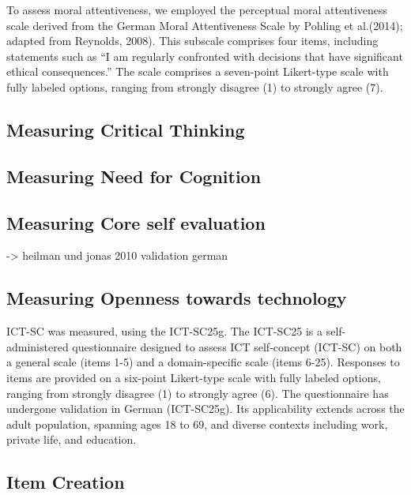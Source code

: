 \documentclass[
  12pt,
  a4paper,
  twoside]{article}
\begin{document}
To assess moral attentiveness, we employed the perceptual moral attentiveness scale derived from the German Moral Attentiveness Scale by Pohling et al.(2014); adapted from Reynolds, 2008). This subscale comprises four items, including statements such as ``I am regularly confronted with decisions that have significant ethical consequences.'' The scale comprises a seven-point Likert-type scale with fully labeled options, ranging from strongly disagree (1) to strongly agree (7).

\hypertarget{measuring-critical-thinking}{%
\subsection{Measuring Critical Thinking}\label{measuring-critical-thinking}}

\hypertarget{measuring-need-for-cognition}{%
\subsection{Measuring Need for Cognition}\label{measuring-need-for-cognition}}

\hypertarget{measuring-core-self-evaluation}{%
\subsection{Measuring Core self evaluation}\label{measuring-core-self-evaluation}}

-\textgreater{} heilman und jonas 2010 validation german

\hypertarget{measuring-openness-towards-technology}{%
\subsection{Measuring Openness towards technology}\label{measuring-openness-towards-technology}}

ICT-SC was measured, using the ICT-SC25g. The ICT-SC25 is a self-administered questionnaire designed to assess ICT self-concept (ICT-SC) on both a general scale (items 1-5) and a domain-specific scale (items 6-25). Responses to items are provided on a six-point Likert-type scale with fully labeled options, ranging from strongly disagree (1) to strongly agree (6). The questionnaire has undergone validation in German (ICT-SC25g). Its applicability extends across the adult population, spanning ages 18 to 69, and diverse contexts including work, private life, and education.

\hypertarget{item-creation}{%
\subsection{Item Creation}\label{item-creation}}
\end{document}
